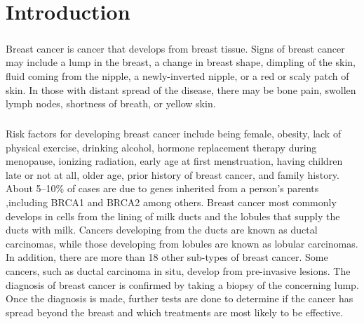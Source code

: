 \documentclass{report}
\begin{document}
\newpage
\tableofcontents 
\newpage	
{}
\listoffigures
\newpage
{}

%

\chapter{Introduction}
\paragraph{}Breast cancer is cancer that develops from breast tissue. Signs of breast cancer may include a lump in the breast, a change in breast shape, dimpling of the skin, fluid coming from the nipple, a newly-inverted nipple, or a red or scaly patch of skin. In those with distant spread of the disease, there may be bone pain, swollen lymph nodes, shortness of breath, or yellow skin. 

\paragraph{}Risk factors for developing breast cancer include being female, obesity, lack of physical exercise, drinking alcohol, hormone replacement therapy during menopause, ionizing radiation, early age at first menstruation, having children late or not at all, older age, prior history of breast cancer, and family history. About 5–10\% of cases are due to genes inherited from a person's parents ,including BRCA1 and BRCA2 among others. Breast cancer most commonly develops in cells from the lining of milk ducts and the lobules that supply the ducts with milk. Cancers developing from the ducts are known as ductal carcinomas, while those developing from lobules are known as lobular carcinomas. In addition, there are more than 18 other sub-types of breast cancer. Some cancers, such as ductal carcinoma in situ, develop from pre-invasive lesions. The diagnosis of breast cancer is confirmed by taking a biopsy of the concerning lump. Once the diagnosis is made, further tests are done to determine if the cancer has spread beyond the breast and which treatments are most likely to be effective.
\end{document}
